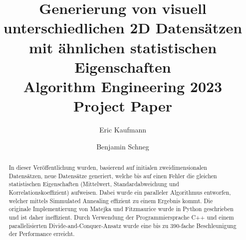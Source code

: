 \documentclass[sigconf]{acmart}
\begin{document}
\title[Generierung von visuell unterschiedlichen 2D Datensätzen mit ähnlichen statistischen Eigenschaften ]{Generierung von visuell unterschiedlichen 2D Datensätzen mit ähnlichen statistischen Eigenschaften\\\large Algorithm Engineering 2023 Project Paper}


\author{Eric Kaufmann}

\author{Benjamin Schneg}

\begin{abstract}


In dieser Veröffentlichung wurden, basierend auf initialen zweidimensionalen Datensätzen, neue Datensätze generiert, welche bis auf einen Fehler die gleichen statistischen Eigenschaften (Mittelwert, Standardabweichung und Korrelationskoeffizient) aufweisen. Dabei wurde ein paralleler Algorithmus entworfen, welcher mittels Simmulated Annealing effizient zu einem Ergebnis kommt. Die originale Implementierung von Matejka und Fitzmaurice \cite{matejka2017same} wurde in Python geschrieben und ist daher ineffizient. Durch Verwendung der Programmiersprache C++ und einem parallelisierten Divide-and-Conquer-Ansatz wurde eine bis zu 390-fache Beschleunigung der Performance erreicht. 


\end{abstract}
\end{document}
